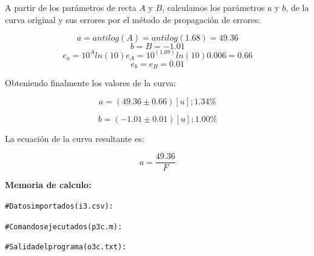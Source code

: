 \documentclass[letter,11pt]{article}
\begin{document}
\begin{enumerate}
    A partir de los parámetros de recta $A$ y $B$, calculamos los parámetros $a$ y
    $b$, de la curva original y sus errores por el método de propagación de errores:

    \begin{equation*}
        a = antilog(A) = antilog(1.68) = 49.36
    \end{equation*}
    \begin{equation*}
        b = B = -1.01
    \end{equation*}
    \begin{equation*}
        e_a = 10^A ln(10) e_A = 10^{(1.69)} ln(10) 0.006 = 0.66
    \end{equation*}
    \begin{equation*}
        e_b = e_B = 0.01
    \end{equation*}

    Obteniendo finalmente los valores de la curva:

    \begin{equation*}
        a = (49.36 \pm 0.66)[u];1.34\%
    \end{equation*}

    \begin{equation*}
        b = (-1.01 \pm 0.01)[u];1.00\%
    \end{equation*}

    La ecuación de la curva resultante es:

    \begin{equation}
        a = \frac{49.36}{F}
    \end{equation}

    \textbf{Memoria de calculo:}
    \begin{shaded}
        \begin{alltt}
            \footnotesize
\# Datos importados (i3.csv):


\# Comandos ejecutados (p3c.m):


\# Salida del programa (o3c.txt):

            \normalsize
        \end{alltt}
    \end{shaded}

\end{enumerate}
\end{document}
